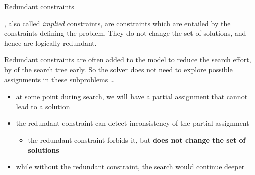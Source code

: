 \documentclass{cons-beamer}
\begin{document}
\begin{frame}{Redundant constraints}
  \begin{definition}
  	, also called \textit{implied} constraints, are constraints which are entailed by the constraints defining the problem. They do not change the set of solutions, and hence are logically redundant.
  \end{definition}
  \vfill

  Redundant constraints are often added to the model to reduce the search effort, by  of the search tree early. 
  So the solver does not need to explore possible assignments in these subproblems \dots   
  \vfill

  \begin{itemize}
    \item at some point during search, we will have a partial assignment that cannot lead to a solution
    \item the redundant constraint can detect inconsistency of the partial assignment
          \begin{itemize}
            \item the redundant constraint forbids it, but \textbf{does not change the set of solutions}
          \end{itemize}
    \item while without the redundant constraint, the search would continue deeper
  \end{itemize}
\end{frame}
\end{document}
